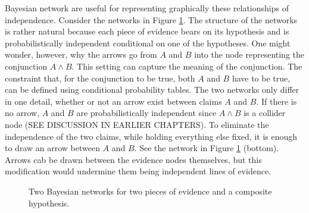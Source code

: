 \documentclass[10pt,dvipsnames,enabledeprecatedfontcommands]{scrartcl}
\begin{document}
Bayesian network are useful for representing graphically these
relationships of independence. Consider the networks in Figure
\ref{network-conjunction}. The structure of the networks is rather
natural because each piece of evidence bears on its hypothesis and is
probabilistically independent conditional on one of the hypotheses. One
might wonder, however, why the arrows go from \(A\) and \(B\) into the
node representing the conjunction \(A\wedge B\). This setting can
capture the meaning of the conjunction. The constraint that, for the
conjunction to be true, both \(A\) and \(B\) have to be true, can be
defined using conditional probability tables. The two networks only
differ in one detail, whether or not an arrow exist between claims \(A\)
and \(B\). If there is no arrow, \(A\) and \(B\) are probabilistically
independent since \(A\wedge B\) is a collider node (SEE DISCUSSION IN
EARLIER CHAPTERS). To eliminate the independence of the two claims,
while holding everything else fixed, it is enough to draw an arrow
between \(A\) and \(B\). See the network in Figure
\ref{network-conjunction} (bottom). Arrows cab be drawn between the
evidence nodes themselves, but this modification would undermine them
being independent lines of evidence.

\begin{center}
\begin{figure}[h!]

\caption{Two Bayesian networks for two pieces of evidence and a composite hypothesis.}
\label{network-conjunction}
\end{figure}
\end{center}
\end{document}
